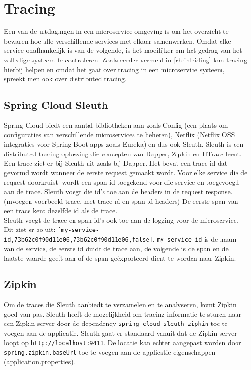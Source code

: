 \section{Tracing}
\label{sec:tracing}

Een van de uitdagingen in een microservice omgeving is om het overzicht te bewaren hoe alle verschillende services met elkaar samenwerken. Omdat elke service onafhankelijk is van de volgende, is het moeilijker om het gedrag van het volledige systeem te controleren. Zoals eerder vermeld in \ref{ch:inleiding} kan tracing hierbij helpen en omdat het gaat over tracing in een microservice systeem, spreekt men ook over distributed tracing. \\

\subsection{Spring Cloud Sleuth}
\label{sec:sleuth}

Spring Cloud biedt een aantal bibliotheken aan zoals Config (een plaats om configuraties van verschillende microservices te beheren), Netflix (Netflix OSS integraties voor Spring Boot apps zoals Eureka) en dus ook Sleuth. Sleuth is een distributed tracing oplossing die concepten van Dapper, Zipkin en HTrace leent. \\

Een trace ziet er bij Sleuth uit zoals bij Dapper. Het bevat een trace id dat gevormd wordt wanneer de eerste request gemaakt wordt. Voor elke service die de request doorkruist, wordt een span id toegekend voor die service en toegevoegd aan de trace. Sleuth voegt die id's toe aan de headers in de request response. (invoegen voorbeeld trace, met trace id en span id headers) De eerste span van een trace kent dezelfde id als de trace. \\

Sleuth voegt de trace en span id's ook toe aan de logging voor de microservice. Dit ziet er zo uit: \texttt{[my-service-id,73b62c0f90d11e06,73b62c0f90d11e06,false]}. \texttt{my-service-id} is de naam van de service, de eerste id duidt de trace aan, de volgende is de span en de laatste waarde geeft aan of de span geëxporteerd dient te worden naar Zipkin. \\

\subsection{Zipkin}
\label{sec:zipkin}

Om de traces die Sleuth aanbiedt te verzamelen en te analyseren, komt Zipkin goed van pas. Sleuth heeft de mogelijkheid om tracing informatie te sturen naar een Zipkin server door de dependency \texttt{spring-cloud-sleuth-zipkin} toe te voegen aan de applicatie. Sleuth gaat er standaard vanuit dat de Zipkin server loopt op \texttt{http://localhost:9411}. De locatie kan echter aangepast worden door \texttt{spring.zipkin.baseUrl} toe te voegen aan de applicatie eigenschappen (application.properties). \\


